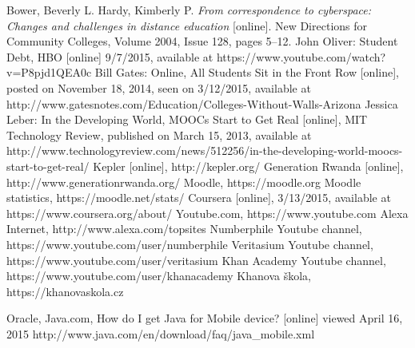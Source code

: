 
\def\bibname{Bibliography}
\begin{thebibliography}{99}
\addcontentsline{toc}{chapter}{\bibname}


{\sc Bower,} Beverly L. {\sc Hardy,} Kimberly P.
\emph{From correspondence to cyberspace: Changes and challenges in distance education} [online].
New Directions for Community Colleges, Volume 2004, Issue 128, pages 5–12.
John Oliver: Student Debt, HBO [online] 9/7/2015, available at https://www.youtube.com/watch?v=P8pjd1QEA0c
Bill Gates: Online, All Students Sit in the Front Row [online], posted on November 18, 2014, seen on 3/12/2015, available at http://www.gatesnotes.com/Education/Colleges-Without-Walls-Arizona
Jessica Leber: In the Developing World, MOOCs Start to Get Real [online], MIT Technology Review, published on March 15, 2013, available at http://www.technologyreview.com/news/512256/in-the-developing-world-moocs-start-to-get-real/
Kepler [online], http://kepler.org/
Generation Rwanda [online], http://www.generationrwanda.org/
Moodle, https://moodle.org
Moodle statistics, https://moodle.net/stats/
Coursera [online], 3/13/2015, available at https://www.coursera.org/about/
Youtube.com, https://www.youtube.com
Alexa Internet, http://www.alexa.com/topsites
Numberphile Youtube channel, https://www.youtube.com/user/numberphile
Veritasium Youtube channel, https://www.youtube.com/user/veritasium
Khan Academy Youtube channel, https://www.youtube.com/user/khanacademy
Khanova škola, https://khanovaskola.cz



\bibitem{}
Oracle, Java.com, How do I get Java for Mobile device? [online] viewed April 16, 2015
http://www.java.com/en/download/faq/java\_mobile.xml


\bibitem{}


\end{thebibliography}
